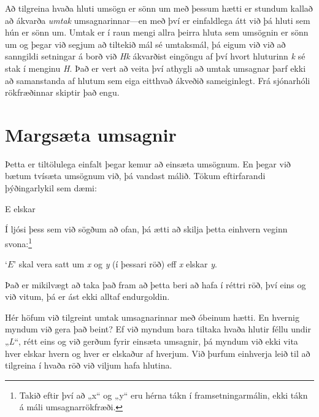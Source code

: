 Að tilgreina hvaða hluti umsögn er sönn um með þessum hætti er stundum kallað að ákvarða \emph{umtak} umsagnarinnar---en með því er einfaldlega átt við þá hluti sem hún er sönn um. Umtak er í raun mengi allra þeirra hluta sem umsögnin er sönn um og þegar við segjum að tiltekið mál sé umtaksmál, þá eigum við við að sanngildi setningar á borð við \emph{Hk} ákvarðist eingöngu af því hvort hluturinn \emph{k} sé stak í menginu \emph{H}. Það er vert að veita því athygli að umtak umsagnar þarf ekki að samanstanda af hlutum sem eiga eitthvað ákveðið sameiginlegt. Frá sjónarhóli rökfræðinnar skiptir það engu.

\section{Margsæta umsagnir}
Þetta er tiltölulega einfalt þegar kemur að einsæta umsögnum. En þegar við bætum tvísæta umsögnum við, þá vandast málið. Tökum eftirfarandi þýðingarlykil sem dæmi:
	\begin{ekey}
		\item[E]  elskar 
	\end{ekey}
Í ljósi þess sem við sögðum að ofan, þá ætti að skilja þetta einhvern veginn svona:\footnote{Takið eftir því að „x“ og „y“ eru hérna tákn í framsetningarmálin, ekki tákn á máli umsagnarrökfræði.}
	\begin{earg}
		\item[\textbullet] `$E$' skal vera satt um \emph{x} og \emph{y} (í þessari röð) eff \emph{x} elskar \emph{y}. 
	\end{earg}
Það er mikilvægt að taka það fram að þetta beri að hafa í réttri röð, því eins og við vitum, þá er ást ekki alltaf endurgoldin.	

Hér höfum við tilgreint umtak umsagnarinnar með óbeinum hætti. En hvernig myndum við gera það beint? Ef við myndum bara tiltaka hvaða hlutir féllu undir „\emph{L}“, rétt eins og við gerðum fyrir einsæta umsagnir, þá myndum við ekki vita hver elskar hvern og hver er elskaður af hverjum. Við þurfum einhverja leið til að tilgreina í hvaða röð við viljum hafa hlutina.

